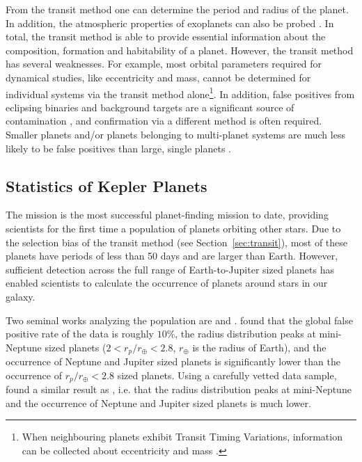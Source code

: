 From the transit method one can determine the period and radius of the planet. 
In addition, the atmospheric properties of exoplanets can also be probed \citep{Kreidberg2014, Tsiaras2016, Stevenson2016}.
In total, the transit method is able to provide essential information about the composition, formation and habitability of a planet. 
However, the transit method has several weaknesses. 
For example, most orbital parameters required for dynamical studies, like eccentricity and mass, cannot be determined for individual systems via the transit method alone\footnote{When neighbouring planets exhibit Transit Timing Variations, information can be collected about eccentricity and mass \citep{Holman2005}.}.
In addition, false positives from eclipsing binaries and background targets are a significant source of contamination \citep{Fressin2013}, and confirmation via a different method is often required. 
Smaller planets and/or planets belonging to multi-planet systems are much less likely to be false positives than large, single planets \citep{Fressin2013, Lissauer2011}.

\subsection{Statistics of Kepler Planets}
\label{sec:stats}
The \kep mission is the most successful planet-finding mission to date, providing scientists for the first time a population of planets orbiting other stars. 
Due to the selection bias of the transit method (see Section~\ref{sec:transit}), most of these planets have periods of less than 50 days and are larger than Earth. 
However, sufficient detection across the full range of Earth-to-Jupiter sized planets has enabled scientists to calculate the occurrence of planets around stars in our galaxy. 

Two seminal works analyzing the \kep population are \citet{Fressin2013} and \citet{Petigura2013}.
\citet{Fressin2013} found that the global false positive rate of the \kep data is roughly $10\%$, the radius distribution peaks at mini-Neptune sized planets ($2<r_p/r_{\oplus}<2.8$, $r_{\oplus}$ is the radius of Earth), and the occurrence of Neptune and Jupiter sized planets is significantly lower than the occurrence of $r_p/r_{\oplus}<2.8$ sized planets.
Using a carefully vetted data sample, \citet{Petigura2013} found a similar result as \citet{Fressin2013}, i.e. that the radius distribution peaks at mini-Neptune and the occurrence of Neptune and Jupiter sized planets is much lower.


